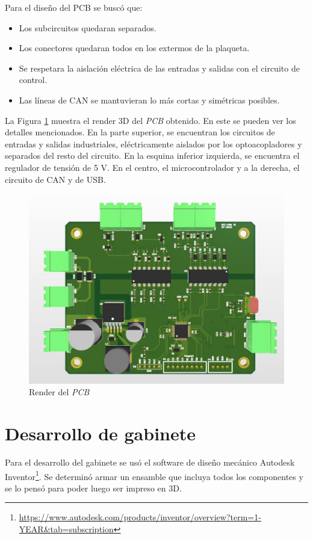 Para el diseño del PCB se buscó que:
\begin{itemize}
	\item Los subcircuitos quedaran separados.
	\item Los conectores quedaran todos en los extermos de la plaqueta.
	\item Se respetara la aislación eléctrica de las entradas y salidas con el circuito de control.
	\item Las líneas de CAN se mantuvieran lo más cortas y simétricas posibles.
\end{itemize}

La Figura \ref{fig:render_pcb} muestra el render 3D del \textit{PCB} obtenido. En este se pueden ver los detalles mencionados. En la parte superior, se encuentran los circuitos de entradas y salidas industriales, eléctricamente aislados por los optoacopladores y separados del resto del circuito. En la esquina inferior izquierda, se encuentra el regulador de tensión de 5 V. En el centro, el microcontrolador y a la derecha, el circuito de CAN y de USB.

\begin{figure}[htbp]
	\centering
	\includegraphics[scale=.5]{./Figures/pcb_sch.JPG}
	\caption{Render del \textit{PCB}}
	\label{fig:render_pcb}
\end{figure}

\section{Desarrollo de gabinete}

Para el desarrollo del gabinete se usó el software de diseño mecánico Autodesk Inventor\footnote{\url{https://www.autodesk.com/products/inventor/overview?term=1-YEAR&tab=subscription}}. Se determinó armar un ensamble que incluya todos los componentes y se lo pensó para poder luego ser impreso en 3D.

